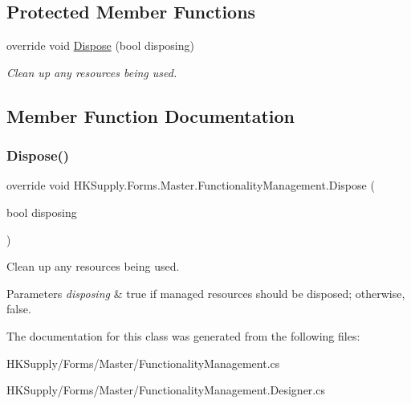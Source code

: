 \subsection*{Protected Member Functions}
\begin{DoxyCompactItemize}
\item 
override void \hyperlink{class_h_k_supply_1_1_forms_1_1_master_1_1_functionality_management_a36e30f6560cd85f1d5369dadd79487d4}{Dispose} (bool disposing)
\begin{DoxyCompactList}\small\item\em Clean up any resources being used. \end{DoxyCompactList}\end{DoxyCompactItemize}


\subsection{Member Function Documentation}
\mbox{\label{class_h_k_supply_1_1_forms_1_1_master_1_1_functionality_management_a36e30f6560cd85f1d5369dadd79487d4}} 
\subsubsection{\texorpdfstring{Dispose()}{Dispose()}}
{\footnotesize\ttfamily override void H\+K\+Supply.\+Forms.\+Master.\+Functionality\+Management.\+Dispose (\begin{DoxyParamCaption}\item[{bool}]{disposing }\end{DoxyParamCaption})\hspace{0.3cm}{\ttfamily [protected]}}



Clean up any resources being used. 


\begin{DoxyParams}{Parameters}
{\em disposing} & true if managed resources should be disposed; otherwise, false.\\
\hline
\end{DoxyParams}


The documentation for this class was generated from the following files\+:\begin{DoxyCompactItemize}
\item 
H\+K\+Supply/\+Forms/\+Master/Functionality\+Management.\+cs\item 
H\+K\+Supply/\+Forms/\+Master/Functionality\+Management.\+Designer.\+cs\end{DoxyCompactItemize}
